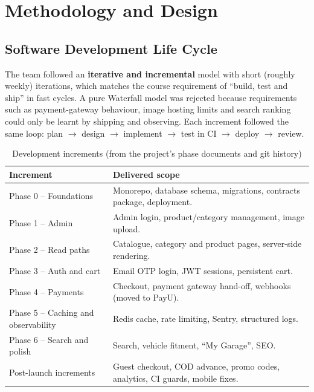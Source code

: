 \documentclass{tietreport}
\begin{document}
\chapter{Methodology and Design}

\section{Software Development Life Cycle}

The team followed an \textbf{iterative and incremental} model with short
(roughly weekly) iterations, which matches the course requirement of
``build, test and ship'' in fast cycles. A pure Waterfall model was rejected
because requirements such as payment-gateway behaviour, image hosting limits
and search ranking could only be learnt by shipping and observing. Each
increment followed the same loop: plan $\rightarrow$ design $\rightarrow$
implement $\rightarrow$ test in CI $\rightarrow$ deploy $\rightarrow$ review.

\begin{table}[H]
\centering\small
\begin{tabularx}{\linewidth}{l X}
\toprule
\textbf{Increment} & \textbf{Delivered scope} \\
\midrule
Phase 0 -- Foundations & Monorepo, database schema, migrations, contracts package, deployment. \\
Phase 1 -- Admin & Admin login, product/category management, image upload. \\
Phase 2 -- Read paths & Catalogue, category and product pages, server-side rendering. \\
Phase 3 -- Auth and cart & Email OTP login, JWT sessions, persistent cart. \\
Phase 4 -- Payments & Checkout, payment gateway hand-off, webhooks (moved to PayU). \\
Phase 5 -- Caching and observability & Redis cache, rate limiting, Sentry, structured logs. \\
Phase 6 -- Search and polish & Search, vehicle fitment, ``My Garage'', SEO. \\
Post-launch increments & Guest checkout, COD advance, promo codes, analytics, CI guards, mobile fixes. \\
\bottomrule
\end{tabularx}
\caption{Development increments (from the project's phase documents and git history)}
\label{tab:phases}
\end{table}
\end{document}
